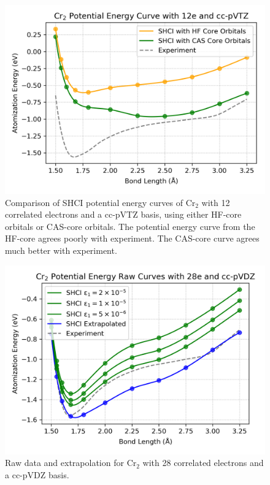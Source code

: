 \begin{figure}
  \begin{center}
  \includegraphics[width=0.9\linewidth]{figs/cashf.png}
  \caption{Comparison of SHCI potential energy curves of Cr$_2$ with 12 correlated electrons and a cc-pVTZ basis, using either HF-core orbitals or CAS-core orbitals.
  The potential energy curve from the HF-core agrees poorly with experiment.
  The CAS-core curve agrees much better with experiment.
  }
  \label{fig:cashf}
  \end{center}
\end{figure}

\begin{figure}
  \begin{center}
  \includegraphics[width=0.9\linewidth]{figs/cr2raw.png}
  \caption{Raw data and extrapolation for Cr$_2$ with 28 correlated electrons and a cc-pVDZ basis.
  }
  \label{fig:cr2raw}
  \end{center}
\end{figure}


